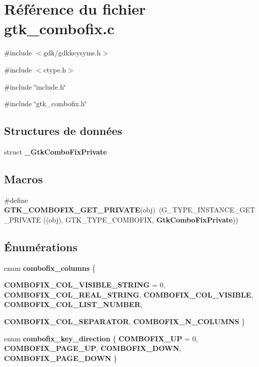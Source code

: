 \section{Référence du fichier gtk\_\-combofix.c}
\label{gtk__combofix_8c}
{\ttfamily \#include $<$gdk/gdkkeysyms.h$>$}\par
{\ttfamily \#include $<$ctype.h$>$}\par
{\ttfamily \#include \char`\"{}include.h\char`\"{}}\par
{\ttfamily \#include \char`\"{}gtk\_\-combofix.h\char`\"{}}\par
\subsection*{Structures de données}
\begin{DoxyCompactItemize}
\item 
struct {\bf \_\-GtkComboFixPrivate}
\end{DoxyCompactItemize}
\subsection*{Macros}
\begin{DoxyCompactItemize}
\item 
\#define {\bf GTK\_\-COMBOFIX\_\-GET\_\-PRIVATE}(obj)~(G\_\-TYPE\_\-INSTANCE\_\-GET\_\-PRIVATE ((obj), GTK\_\-TYPE\_\-COMBOFIX, {\bf GtkComboFixPrivate}))
\end{DoxyCompactItemize}
\subsection*{Énumérations}
\begin{DoxyCompactItemize}
\item 
enum {\bf combofix\_\-columns} \{ \par
{\bf COMBOFIX\_\-COL\_\-VISIBLE\_\-STRING} =  0, 
{\bf COMBOFIX\_\-COL\_\-REAL\_\-STRING}, 
{\bf COMBOFIX\_\-COL\_\-VISIBLE}, 
{\bf COMBOFIX\_\-COL\_\-LIST\_\-NUMBER}, 
\par
{\bf COMBOFIX\_\-COL\_\-SEPARATOR}, 
{\bf COMBOFIX\_\-N\_\-COLUMNS}
 \}
\item 
enum {\bf combofix\_\-key\_\-direction} \{ {\bf COMBOFIX\_\-UP} =  0, 
{\bf COMBOFIX\_\-PAGE\_\-UP}, 
{\bf COMBOFIX\_\-DOWN}, 
{\bf COMBOFIX\_\-PAGE\_\-DOWN}
 \}
\end{DoxyCompactItemize}
